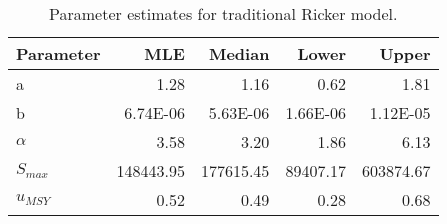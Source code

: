 \begin{table}[ht]
\centering
\caption{Parameter estimates for traditional Ricker model.} 
\label{estparsimple}
\begin{tabular}{lrrrr}
  \hline
Parameter & MLE & Median & Lower & Upper \\ 
  \hline
a & 1.28 & 1.16 & 0.62 & 1.81 \\ 
  b & 6.74E-06 & 5.63E-06 & 1.66E-06 & 1.12E-05 \\ 
  $\alpha$ & 3.58 & 3.20 & 1.86 & 6.13 \\ 
  $S_{max}$ & 148443.95 & 177615.45 & 89407.17 & 603874.67 \\ 
  $u_{MSY}$ & 0.52 & 0.49 & 0.28 & 0.68 \\ 
   \hline
\end{tabular}
\end{table}
